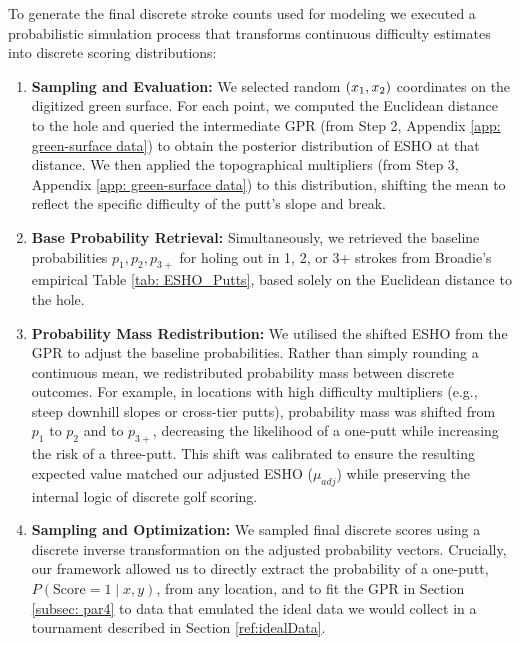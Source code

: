 \documentclass[11pt, letterpaper]{article}
\begin{document}
\begin{enumerate}
To generate the final discrete stroke counts used for modeling we executed a probabilistic simulation process that transforms continuous difficulty estimates into discrete scoring distributions:
\begin{enumerate}
    \item \textbf{Sampling and Evaluation:} We selected random $(x_1, x_2)$ coordinates on the digitized green surface. For each point, we computed the Euclidean distance to the hole and queried the intermediate GPR (from Step 2, Appendix \ref{app: green-surface data}) to obtain the posterior distribution of ESHO at that distance. We then applied the topographical multipliers (from Step 3, Appendix \ref{app: green-surface data}) to this distribution, shifting the mean to reflect the specific difficulty of the putt's slope and break.

    \item \textbf{Base Probability Retrieval:} Simultaneously, we retrieved the baseline probabilities $p_1, p_2, p_{3+}$ for holing out in 1, 2, or 3+ strokes from Broadie's empirical Table \ref{tab: ESHO_Putts}, based solely on the Euclidean distance to the hole.

    \item \textbf{Probability Mass Redistribution:} We utilised the shifted ESHO from the GPR to adjust the baseline probabilities. Rather than simply rounding a continuous mean, we redistributed probability mass between discrete outcomes. For example, in locations with high difficulty multipliers (e.g., steep downhill slopes or cross-tier putts), probability mass was shifted from $p_1$ to $p_2$ and to $p_{3+}$, decreasing the likelihood of a one-putt while increasing the risk of a three-putt. This shift was calibrated to ensure the resulting expected value matched our adjusted ESHO ($\mu_{adj}$) while preserving the internal logic of discrete golf scoring.

    \item \textbf{Sampling and Optimization:} We sampled final discrete scores using a discrete inverse transformation on the adjusted probability vectors. Crucially, our framework allowed us to directly extract the probability of a one-putt, $P(\text{Score}=1 \mid x, y)$, from any location, and to fit the GPR in Section \ref{subsec: par4} to data that emulated the ideal data we would collect in a tournament described in Section \ref{ref:idealData}. 
\end{enumerate}
\end{enumerate}
\end{document}
